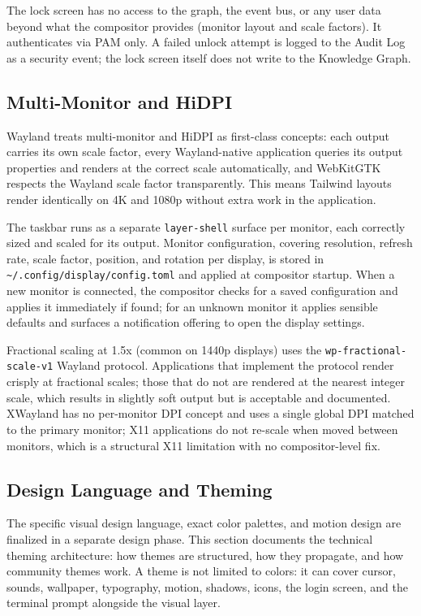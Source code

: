 The lock screen has no access to the graph, the event bus, or any user data
beyond what the compositor provides (monitor layout and scale factors). It
authenticates via PAM only. A failed unlock attempt is logged to the Audit Log
as a security event; the lock screen itself does not write to the Knowledge
Graph.

\subsection{Multi-Monitor and HiDPI}
\label{sec:multimonitor}

Wayland treats multi-monitor and HiDPI as first-class concepts: each output
carries its own scale factor, every Wayland-native application queries its
output properties and renders at the correct scale automatically, and
WebKitGTK respects the Wayland scale factor transparently. This means Tailwind
layouts render identically on 4K and 1080p without extra work in the
application.

The taskbar runs as a separate \texttt{layer-shell} surface per monitor, each
correctly sized and scaled for its output. Monitor configuration, covering
resolution, refresh rate, scale factor, position, and rotation per display, is
stored in \texttt{\textasciitilde/.config/display/config.toml} and applied at
compositor startup. When a new monitor is connected, the compositor checks for
a saved configuration and applies it immediately if found; for an unknown
monitor it applies sensible defaults and surfaces a notification offering to
open the display settings.

Fractional scaling at 1.5x (common on 1440p displays) uses the
\texttt{wp-fractional-scale-v1} Wayland protocol. Applications that implement
the protocol render crisply at fractional scales; those that do not are
rendered at the nearest integer scale, which results in slightly soft output
but is acceptable and documented. XWayland has no per-monitor DPI concept and
uses a single global DPI matched to the primary monitor; X11 applications do
not re-scale when moved between monitors, which is a structural X11 limitation
with no compositor-level fix.

\subsection{Design Language and Theming}
\label{sec:theming}

The specific visual design language, exact color palettes, and motion design
are finalized in a separate design phase. This section documents the technical
theming architecture: how themes are structured, how they propagate, and how
community themes work. A theme is not limited to colors: it can cover cursor,
sounds, wallpaper, typography, motion, shadows, icons, the login screen, and
the terminal prompt alongside the visual layer.

